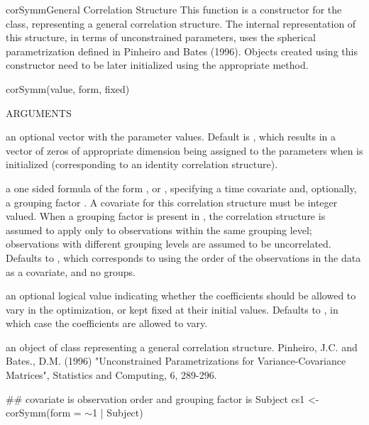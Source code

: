 \documentclass[pdftex]{article} \usepackage{url,graphicx}
\renewcommand{\Twiddle}{\mbox{\(\sim\)}}
\begin{document}
\begin{Helpfile}{corSymm}{General Correlation Structure}
This function is a constructor for the  class,
representing a general correlation structure. The internal
representation of this structure, in terms of unconstrained
parameters, uses the spherical parametrization defined in Pinheiro and
Bates (1996).  Objects created using this constructor need to be later
initialized using the  appropriate  method.
\begin{Example}
corSymm(value, form, fixed)
\end{Example}
\begin{Argument}{ARGUMENTS}
\item[\Co{value:}]
an optional vector with the parameter values. Default is
, which results in a vector of zeros of appropriate
dimension being assigned to the parameters when  is
initialized (corresponding to an identity correlation structure).
\item[\Co{form:}]
a one sided formula of the form \Co{\Twiddle t}, or \Co{\Twiddle t |
g}, specifying a time covariate  and,  optionally, a
grouping factor . A covariate for this correlation structure
must be integer valued. When a grouping factor is present in
, the correlation structure is assumed to apply only
to observations within the same grouping level; observations with
different grouping levels are assumed to be uncorrelated. Defaults to
\Co{\Twiddle 1}, which corresponds to using the order of the observations
in the data as a covariate, and no groups.
\item[\Co{fixed:}]
an optional logical value indicating whether the
coefficients should be allowed to vary in the optimization, or kept
fixed at their initial values. Defaults to , in which case
the coefficients are allowed to vary.
\end{Argument}
an object of class  representing a general correlation
structure.
Pinheiro, J.C. and Bates., D.M.  (1996) "Unconstrained
Parametrizations for Variance-Covariance Matrices", Statistics and
Computing, 6, 289-296.
\need 15pt
\vspace{-16pt} 
\begin{Example}
## covariate is observation order and grouping factor is Subject
cs1 <- corSymm(form = \Twiddle 1 | Subject)
\end{Example}
\end{Helpfile}
\end{document}
